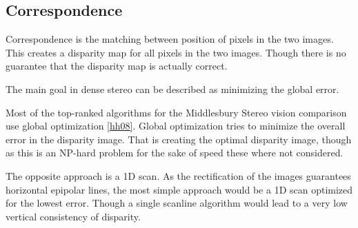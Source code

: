 %
%
%
%
%
%

\subsection{Correspondence} \label{sec:correspondence}

Correspondence is the matching between position of pixels in the two images. This creates a disparity map for all pixels in the two images. Though there is no guarantee that the disparity map is actually correct. 


The main goal in dense stereo can be described as minimizing the global error. 

Most of the top-ranked algorithms for the Middlesbury Stereo vision comparison use global optimization \ref{hh08}. Global optimization tries to minimize the overall error in the disparity image. That is creating the optimal disparity image, though as this is an NP-hard problem for the sake of speed these where not considered.

The opposite approach is a 1D scan. As the rectification of the images guarantees horizontal epipolar lines, the most simple approach would be a 1D scan optimized for the lowest error. Though a single scanline algorithm would lead to a very low vertical consistency of disparity. 

